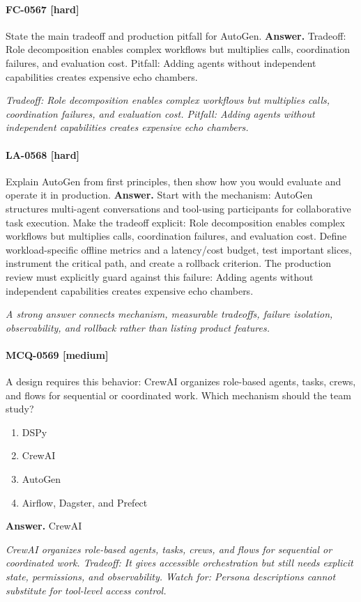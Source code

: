\paragraph{FC-0567 [hard]} State the main tradeoff and production pitfall for AutoGen.
\noindent\textbf{Answer.} Tradeoff: Role decomposition enables complex workflows but multiplies calls, coordination failures, and evaluation cost. Pitfall: Adding agents without independent capabilities creates expensive echo chambers.
\par\textit{Tradeoff: Role decomposition enables complex workflows but multiplies calls, coordination failures, and evaluation cost. Pitfall: Adding agents without independent capabilities creates expensive echo chambers.}
\paragraph{LA-0568 [hard]} Explain AutoGen from first principles, then show how you would evaluate and operate it in production.
\noindent\textbf{Answer.} Start with the mechanism: AutoGen structures multi-agent conversations and tool-using participants for collaborative task execution. Make the tradeoff explicit: Role decomposition enables complex workflows but multiplies calls, coordination failures, and evaluation cost. Define workload-specific offline metrics and a latency/cost budget, test important slices, instrument the critical path, and create a rollback criterion. The production review must explicitly guard against this failure: Adding agents without independent capabilities creates expensive echo chambers.
\par\textit{A strong answer connects mechanism, measurable tradeoffs, failure isolation, observability, and rollback rather than listing product features.}
\paragraph{MCQ-0569 [medium]} A design requires this behavior: CrewAI organizes role-based agents, tasks, crews, and flows for sequential or coordinated work. Which mechanism should the team study?
\begin{enumerate}[label=\Alph*.]
\item DSPy
\item CrewAI
\item AutoGen
\item Airflow, Dagster, and Prefect
\end{enumerate}
\noindent\textbf{Answer.} CrewAI
\par\textit{CrewAI organizes role-based agents, tasks, crews, and flows for sequential or coordinated work. Tradeoff: It gives accessible orchestration but still needs explicit state, permissions, and observability. Watch for: Persona descriptions cannot substitute for tool-level access control.}
